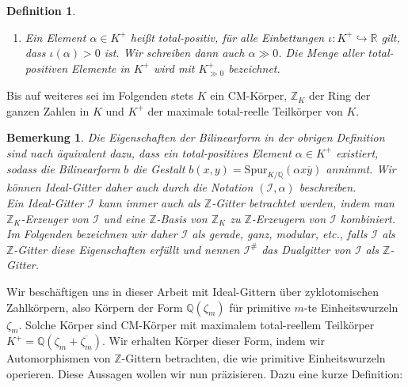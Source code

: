 \documentclass[12pt,a4paper,halfparskip,headsepline,bibtotocnumbered]{scrreprt}
\theoremstyle{nummermitklammern}
\newtheorem{definition}[defsatzusw]{Definition}
\newtheorem{bemerkung}[defsatzusw]{Bemerkung}
\theoremstyle{nonumberbreak}
\newcommand{\Z}{\mathbb{Z}}
\newcommand{\Q}{\mathbb{Q}}
\newcommand{\R}{\mathbb{R}}
\newcommand{\I}{\mathcal{I}}
\begin{document}
\begin{framed}
\begin{definition}
\begin{enumerate}[label=(\roman*)]
				$b:\I \times \I \rightarrow \R$ eine symmetrische positiv-definite Bilinearform mit $b(\lambda x, y) = b(x, \overline{\lambda} y)$ für $x,y \in \I$ und $\lambda \in \Z_K$. Die Abbildung $\lambda \mapsto \overline{\lambda}$ bezeichnet dabei die herkömmliche komplexe Konjugation.
			\item Ein Element $\alpha \in K^+$ heißt \textit{total-positiv}, für alle Einbettungen $\iota : K^+ \hookrightarrow \R$ gilt, dass $\iota(\alpha) > 0$ ist. Wir schreiben dann auch $\alpha \gg 0$. Die Menge aller total-positiven Elemente in $K^+$ wird mit $K^+_{\gg 0}$ bezeichnet.
		\end{enumerate}
	\end{definition}
\end{framed}

Bis auf weiteres sei im Folgenden stets $K$ ein CM-Körper, $\Z_K$ der Ring der ganzen Zahlen in $K$ und $K^+$ der maximale total-reelle Teilkörper von $K$.

\begin{bemerkung}
	Die Eigenschaften der Bilinearform in der obrigen Definition sind nach \cite{fluckiger} äquivalent dazu, dass ein total-positives Element $\alpha \in K^+$ existiert, sodass die Bilinearform $b$ die Gestalt $b(x,y) = \text{Spur}_{K/\Q}(\alpha x \overline{y})$ annimmt. Wir können Ideal-Gitter daher auch durch die Notation $(\I, \alpha)$ beschreiben.\\
	Ein Ideal-Gitter $\I$ kann immer auch als $\Z$-Gitter betrachtet werden, indem man $\Z_K$-Erzeuger von $\I$ und eine $\Z$-Basis von $\Z_K$ zu $\Z$-Erzeugern von $\I$ kombiniert. Im Folgenden bezeichnen wir daher $\I$ als gerade, ganz, modular, etc., falls $\I$ als $\Z$-Gitter diese Eigenschaften erfüllt und nennen $\I^\#$ das Dualgitter von $\I$ als $\Z$-Gitter.
\end{bemerkung}

Wir beschäftigen uns in dieser Arbeit mit Ideal-Gittern über zyklotomischen Zahlkörpern, also Körpern der Form $\Q(\zeta_m)$ für primitive $m$-te Einheitswurzeln $\zeta_m$. Solche Körper sind CM-Körper mit maximalem total-reellem Teilkörper $K^+ = \Q(\zeta_m + \overline{\zeta_m})$. Wir erhalten Körper dieser Form, indem wir Automorphismen von $\Z$-Gittern betrachten, die wie primitive Einheitswurzeln operieren. Diese Aussagen wollen wir nun präzisieren. Dazu eine kurze Definition:
\end{document}
